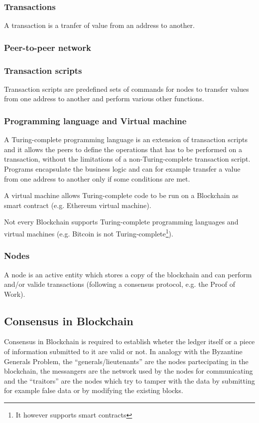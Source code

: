 \subsubsection*{Transactions}
A transaction is a tranfer of value from an address to another.


\subsubsection*{Peer-to-peer network}


\subsubsection*{Transaction scripts}
Transaction scripts are predefined sets of commands for nodes to transfer values
from one address to another and perform various other functions.


\subsubsection*{Programming language and Virtual machine}
A Turing-complete programming language is an extension of transaction scripts and
it allows the peers to define the operations that has to be performed on a
transaction, without the limitations of a non-Turing-complete transaction script.
Programs encapsulate the business logic and can for example transfer a value
from one address to another only if some conditions are met.

A virtual machine allows Turing-complete code to be run on a Blockchain as
smart contract (e.g. Ethereum virtual machine).

Not every Blockchain supports Turing-complete programming languages and virtual
machines (e.g. Bitcoin is not Turing-complete\footnote{It however supports
smart contracts}).


\subsubsection*{Nodes}
A node is an active entity which stores a copy of the blockchain and can perform
and/or valide transactions (following a consensus protocol, e.g. the Proof of Work).









\subsection{Consensus in Blockchain}
Consensus in Blockchain is required to establish wheter the ledger itself or
a piece of information submitted to it are valid or not. In analogy with the
Byzantine Generals Problem, the ``generals/lieutenants'' are the nodes partecipating
in the blockchain, the messangers are the network used by the nodes for communicating
and the ``traitors'' are the nodes which try to tamper with the data by submitting
for example false data or by modifying the existing blocks.

